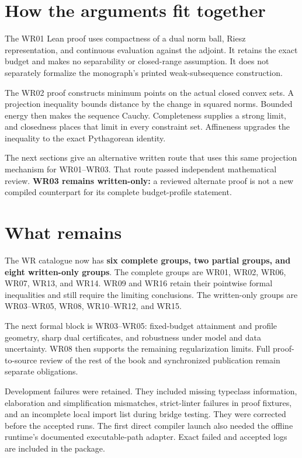 \documentclass[11pt]{article}
\begin{document}
\hypertarget{how-the-arguments-fit-together}{%
\section{How the arguments fit
together}\label{how-the-arguments-fit-together}}

The WR01 Lean proof uses compactness of a dual norm ball, Riesz
representation, and continuous evaluation against the adjoint. It
retains the exact budget and makes no separability or closed-range
assumption. It does not separately formalize the monograph's printed
weak-subsequence construction.

The WR02 proof constructs minimum points on the actual closed convex
sets. A projection inequality bounds distance by the change in squared
norms. Bounded energy then makes the sequence Cauchy. Completeness
supplies a strong limit, and closedness places that limit in every
constraint set. Affineness upgrades the inequality to the exact
Pythagorean identity.

The next sections give an alternative written route that uses this same
projection mechanism for WR01--WR03. That route passed independent
mathematical review. \textbf{WR03 remains written-only:} a reviewed
alternate proof is not a new compiled counterpart for its complete
budget-profile statement.

\hypertarget{what-remains}{%
\section{What remains}\label{what-remains}}

The WR catalogue now has \textbf{six complete groups, two partial
groups, and eight written-only groups}. The complete groups are WR01,
WR02, WR06, WR07, WR13, and WR14. WR09 and WR16 retain their pointwise
formal inequalities and still require the limiting conclusions. The
written-only groups are WR03--WR05, WR08, WR10--WR12, and WR15.

The next formal block is WR03--WR05: fixed-budget attainment and profile
geometry, sharp dual certificates, and robustness under model and data
uncertainty. WR08 then supports the remaining regularization limits.
Full proof-to-source review of the rest of the book and synchronized
publication remain separate obligations.

Development failures were retained. They included missing typeclass
information, elaboration and simplification mismatches, strict-linter
failures in proof fixtures, and an incomplete local import list during
bridge testing. They were corrected before the accepted runs. The first
direct compiler launch also needed the offline runtime's documented
executable-path adapter. Exact failed and accepted logs are included in
the package.
\end{document}
